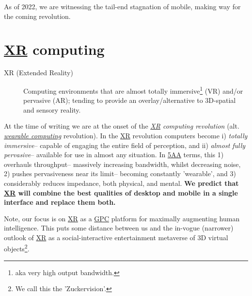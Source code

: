 \documentclass[logo,bsc,singlespacing,parskip]{infthesis}
\begin{document}
As of 2022, we are witnessing the tail-end stagnation of mobile, making way for the coming revolution.

\section{\hyperref[org39cbd51]{XR} computing}
\label{sec:org33e9f1b}
\begin{mdframed}
\begin{description}
\item[{\label{org39cbd51}XR (Extended Reality)}] Computing environments that are almost totally immersive\footnote{aka very high output bandwidth.} (VR) and/or pervasive (AR); tending to provide an overlay/alternative to 3D-spatial and sensory reality.
\end{description}
\end{mdframed}

At the time of writing we are at the onset of the \emph{\hyperref[org39cbd51]{XR} computing revolution} (alt. \emph{\hyperref[wearable computing]{wearable computing}} revolution).
In the \hyperref[org39cbd51]{XR} revolution computers become i) \emph{totally immersive}-- capable of engaging the entire field of perception, and ii) \emph{almost fully pervasive}-- available for use in almost any situation.
In \hyperref[org2644eb5]{5AA} terms, this 1) overhauls throughput-- massively increasing bandwidth, whilst decreasing noise, 2) pushes pervasiveness near its limit-- becoming constantly 'wearable', and 3) considerably reduces impedance, both physical, and mental.
\textbf{We predict that \hyperref[org39cbd51]{XR} will combine the best qualities of desktop and mobile in a single interface and replace them both.}

Note, our focus is on \hyperref[org39cbd51]{XR} as a \hyperref[org6ef4753]{GPC} platform for maximally augmenting human intelligence.
This puts some distance between us and the in-vogue (narrower) outlook of \hyperref[org39cbd51]{XR} as a social-interactive entertainment metaverse of 3D virtual objects\footnote{We call this the 'Zuckervision'.}.
\end{document}
